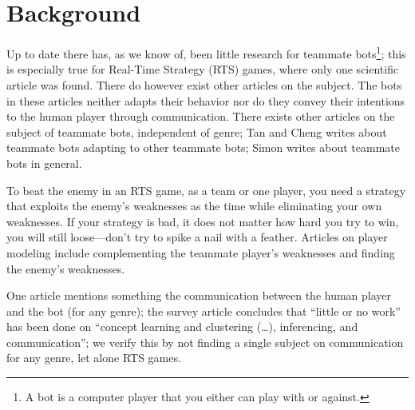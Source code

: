 \section{Background}
Up to date there has, as we know of, been little research for teammate bots\footnote{A bot is a computer player that
you either can play with or against.}; this is especially true for Real-Time Strategy (RTS) games, where only one
scientific article\cite{abraham_ai_2010} was found. There do however exist other articles\cite{jansen07,taylor08} on the
subject. The bots in these articles neither adapts their behavior nor do they convey their intentions to the human
player through communication. There exists other articles on the subject of teammate bots, independent of genre; Tan and
Cheng writes about teammate bots adapting to other teammate bots\cite{Tan_Cheng_2007, zhou_pucheng_multi-agent_2011};
Simon writes about teammate bots in general\cite{simon07}.

To beat the enemy in an RTS game, as a team or one player, you need a strategy that exploits the enemy's weaknesses as
the time while eliminating your own weaknesses. If your strategy is bad, it does not matter how hard you try to win, you
will still loose—don't try to spike a nail with a feather. Articles on player modeling include complementing the
teammate player's weaknesses\cite{jansen07, houlette03, zhou_pucheng_multi-agent_2011} and finding the enemy's
weaknesses\cite{kabanza_opponent_2010, synnaeve_bayesian_2011, schadd_opponent_2007}.

One article\cite{McGee:2010:RTA:1822348.1822365} mentions something the communication between the human player
and the bot (for any genre); the survey article concludes that ``little or no work'' has been done on ``concept learning
and clustering (\ldots), inferencing, and communication''; we verify this by not finding a single subject on
communication for any genre, let alone RTS games.